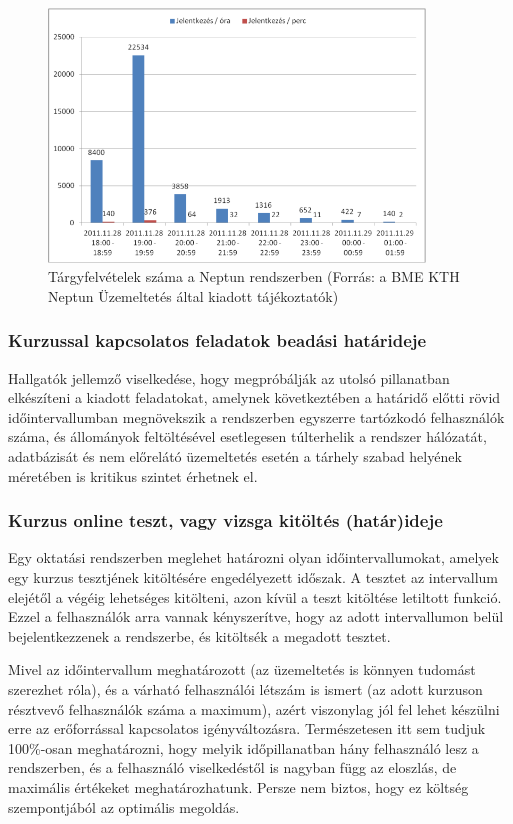 \begin{figure}[!ht]
\centering
\includegraphics[width=100mm, keepaspectratio]{figures/neptun_005.png}
\caption{Tárgyfelvételek száma a Neptun rendszerben (Forrás: a BME KTH Neptun Üzemeltetés által kiadott tájékoztatók)}
\label{fig:neptun_005}
\end{figure}

\subsubsection{Kurzussal kapcsolatos feladatok beadási határideje}

Hallgatók jellemző viselkedése, hogy megpróbálják az utolsó pillanatban elkészíteni a kiadott feladatokat, amelynek következtében a határidő előtti rövid időintervallumban megnövekszik a rendszerben egyszerre tartózkodó felhasználók száma, és állományok feltöltésével esetlegesen túlterhelik a rendszer hálózatát, adatbázisát és nem előrelátó üzemeltetés esetén a tárhely szabad helyének méretében is kritikus szintet érhetnek el.

\subsubsection{Kurzus online teszt, vagy vizsga kitöltés (határ)ideje}

Egy oktatási rendszerben meglehet határozni olyan időintervallumokat, amelyek egy kurzus tesztjének kitöltésére engedélyezett időszak. A tesztet az intervallum elejétől a végéig lehetséges kitölteni, azon kívül a teszt kitöltése letiltott funkció. Ezzel a felhasználók arra vannak kényszerítve, hogy az adott intervallumon belül bejelentkezzenek a rendszerbe, és kitöltsék a megadott tesztet.

Mivel az időintervallum meghatározott (az üzemeltetés is könnyen tudomást szerezhet róla), és a várható felhasználói létszám is ismert (az adott kurzuson résztvevő felhasználók száma a maximum), azért viszonylag jól fel lehet készülni erre az erőforrással kapcsolatos igényváltozásra. Természetesen itt sem tudjuk 100\%-osan meghatározni, hogy melyik időpillanatban hány felhasználó lesz a rendszerben, és a felhasználó viselkedéstől is nagyban függ az eloszlás, de maximális értékeket meghatározhatunk. Persze nem biztos, hogy ez költség szempontjából az optimális megoldás.

